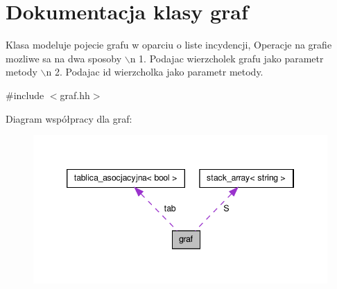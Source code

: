 \hypertarget{classgraf}{\section{\-Dokumentacja klasy graf}
\label{classgraf}
}


\-Klasa modeluje pojecie grafu w oparciu o liste incydencji, \-Operacje na grafie mozliwe sa na dwa sposoby $\backslash$n 1. \-Podajac wierzcholek grafu jako parametr metody $\backslash$n 2. \-Podajac id wierzcholka jako parametr metody.  




{\ttfamily \#include $<$graf.\-hh$>$}



\-Diagram współpracy dla graf\-:\nopagebreak
\begin{figure}[H]
\begin{center}
\leavevmode
\includegraphics[width=346pt]{classgraf__coll__graph}
\end{center}
\end{figure}
